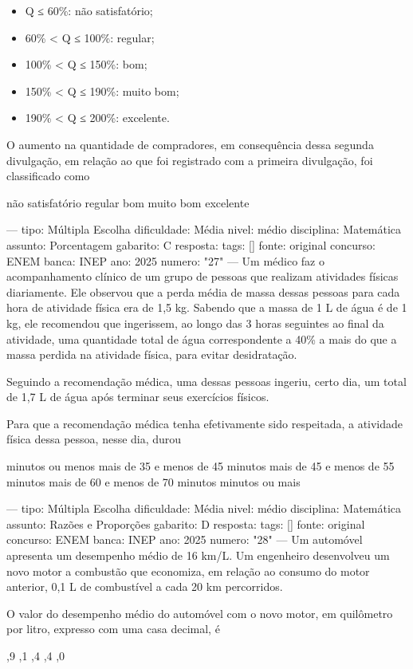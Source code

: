 \begin{itemize}
\item Q ≤ 60\%: não satisfatório;
\item 60\% < Q ≤ 100\%: regular;
\item 100\% < Q ≤ 150\%: bom;
\item 150\% < Q ≤ 190\%: muito bom;
\item 190\% < Q ≤ 200\%: excelente.
\end{itemize}

O aumento na quantidade de compradores, em consequência dessa segunda divulgação, em relação ao que foi registrado com a primeira divulgação, foi classificado como
\begin{choices}
\choice não satisfatório
\choice regular
\CorrectChoice bom
\choice muito bom
\choice excelente
\end{choices}

---
tipo: Múltipla Escolha
dificuldade: Média
nivel: médio
disciplina: Matemática
assunto: Porcentagem
gabarito: C
resposta:
tags: []
fonte: original
concurso: ENEM
banca: INEP
ano: 2025
numero: "27"
---
\question
Um médico faz o acompanhamento clínico de um grupo de pessoas que realizam atividades físicas diariamente. Ele observou que a perda média de massa dessas pessoas para cada hora de atividade física era de 1,5 kg. Sabendo que a massa de 1 L de água é de 1 kg, ele recomendou que ingerissem, ao longo das 3 horas seguintes ao final da atividade, uma quantidade total de água correspondente a 40\% a mais do que a massa perdida na atividade física, para evitar desidratação.

Seguindo a recomendação médica, uma dessas pessoas ingeriu, certo dia, um total de 1,7 L de água após terminar seus exercícios físicos.

Para que a recomendação médica tenha efetivamente sido respeitada, a atividade física dessa pessoa, nesse dia, durou
\begin{choices}
 minutos ou menos
\choice mais de 35 e menos de 45 minutos
\CorrectChoice mais de 45 e menos de 55 minutos
\choice mais de 60 e menos de 70 minutos
 minutos ou mais
\end{choices}

---
tipo: Múltipla Escolha
dificuldade: Média
nivel: médio
disciplina: Matemática
assunto: Razões e Proporções
gabarito: D
resposta:
tags: []
fonte: original
concurso: ENEM
banca: INEP
ano: 2025
numero: "28"
---
\question
Um automóvel apresenta um desempenho médio de 16 km/L. Um engenheiro desenvolveu um novo motor a combustão que economiza, em relação ao consumo do motor anterior, 0,1 L de combustível a cada 20 km percorridos.

O valor do desempenho médio do automóvel com o novo motor, em quilômetro por litro, expresso com uma casa decimal, é
\begin{choices}
,9
,1
,4
,4
,0
\end{choices}
